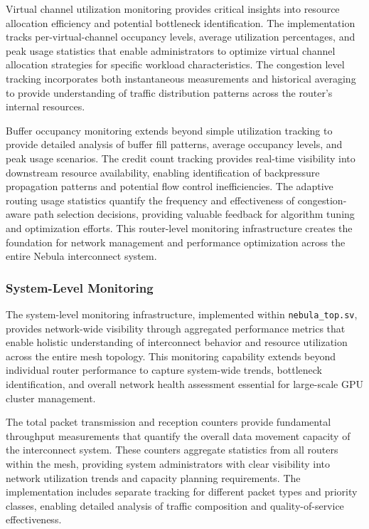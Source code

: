 \documentclass[12pt,letterpaper]{article}
\begin{document}
Virtual channel utilization monitoring provides critical insights into resource allocation efficiency and potential bottleneck identification. The implementation tracks per-virtual-channel occupancy levels, average utilization percentages, and peak usage statistics that enable administrators to optimize virtual channel allocation strategies for specific workload characteristics. The congestion level tracking incorporates both instantaneous measurements and historical averaging to provide understanding of traffic distribution patterns across the router's internal resources.

Buffer occupancy monitoring extends beyond simple utilization tracking to provide detailed analysis of buffer fill patterns, average occupancy levels, and peak usage scenarios. The credit count tracking provides real-time visibility into downstream resource availability, enabling identification of backpressure propagation patterns and potential flow control inefficiencies. The adaptive routing usage statistics quantify the frequency and effectiveness of congestion-aware path selection decisions, providing valuable feedback for algorithm tuning and optimization efforts. This router-level monitoring infrastructure creates the foundation for network management and performance optimization across the entire Nebula interconnect system.

\subsubsection{System-Level Monitoring}

The system-level monitoring infrastructure, implemented within \texttt{nebula\_top.sv}, provides network-wide visibility through aggregated performance metrics that enable holistic understanding of interconnect behavior and resource utilization across the entire mesh topology. This monitoring capability extends beyond individual router performance to capture system-wide trends, bottleneck identification, and overall network health assessment essential for large-scale GPU cluster management.

The total packet transmission and reception counters provide fundamental throughput measurements that quantify the overall data movement capacity of the interconnect system. These counters aggregate statistics from all routers within the mesh, providing system administrators with clear visibility into network utilization trends and capacity planning requirements. The implementation includes separate tracking for different packet types and priority classes, enabling detailed analysis of traffic composition and quality-of-service effectiveness.
\end{document}
